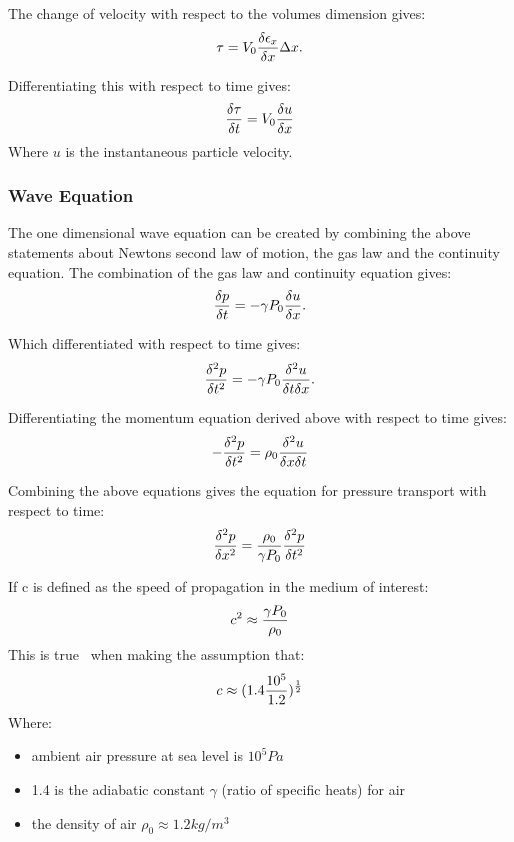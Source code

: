 The change of velocity with respect to the volumes dimension gives:
\begin{equation}
\tau = V_0\frac{\delta \epsilon_x}{\delta x} \Delta x.\\
\end{equation}

Differentiating this with respect to time gives:
\begin{equation}
 \frac{\delta \tau}{\delta t} = V_0\frac{\delta u}{\delta x}\\
\end{equation}
Where $u$ is the instantaneous particle velocity.\\
\subsubsection{Wave Equation}
The one dimensional wave equation can be created by combining the above statements about Newtons second law of motion, the gas law and the continuity equation. The combination of the gas law and continuity equation gives:
\begin{equation}
\frac{\delta p}{\delta t} = -\gamma P_0\frac{\delta u}{\delta x}.\\
\end{equation} 

Which differentiated with respect to time gives:
\begin{equation}
\frac{\delta^2 p}{\delta t^2} = -\gamma P_0\frac{\delta^2 u}{\delta t \delta x}.\\
\end{equation} 

Differentiating the momentum equation derived above with respect to time gives:
\begin{equation}
 -\frac{\delta^2 p}{\delta t^2}=\rho_0\frac{\delta^2 u}{\delta x \delta t}\\
\end{equation}

Combining the above equations gives the equation for pressure transport with respect to time:
\begin{equation}
\frac{\delta^2 p}{\delta x^2}=\frac{\rho_0}{\gamma P_0}\frac{\delta^2 p}{\delta t^2} \\
\end{equation}

If c is defined as the speed of propagation in the medium of interest:
\begin{equation}
c^2\approx \frac{\gamma P_0}{\rho_0}\\
\end{equation} 
This is true~\cite{beranek1954acoustics} when making the assumption that:
\begin{equation}
c \approx (1.4\frac{10^5}{1.2})^\frac{1}{2}\\
\end{equation}
Where:
\begin{itemize}
\item ambient air pressure at sea level is $10^5Pa$
\item  1.4 is the adiabatic constant $\gamma$ (ratio of specific heats) for air
\item the density of air $\rho_0 \approx 1.2kg/m^3 $
\end{itemize}

